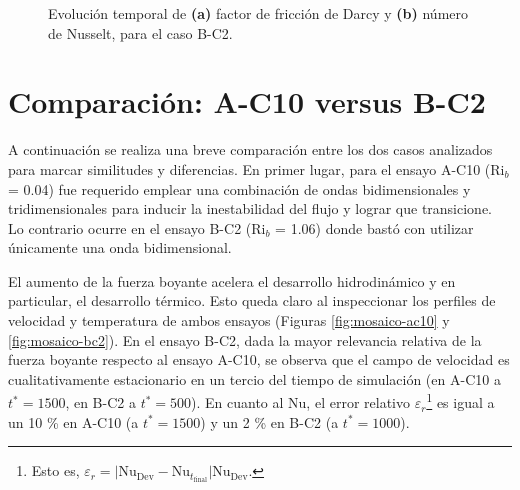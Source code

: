 \begin{figure}[H]
  \centering  
    
  \caption{Evolución temporal de \textbf{(a)} factor de fricción de Darcy y \textbf{(b)} número de Nusselt, para el caso B-C2.}
  \label{fig:bc2-1}
\end{figure}

\section{Comparación: A-C10 versus B-C2}

A continuación se realiza una breve comparación entre los dos casos analizados para marcar similitudes y diferencias. En primer lugar, para el ensayo A-C10 (Ri$_b$ = 0.04) fue requerido emplear una combinación de ondas bidimensionales y tridimensionales para inducir la inestabilidad del flujo y lograr que transicione. Lo contrario ocurre en el ensayo B-C2 (Ri$_b$ = 1.06) donde bastó con utilizar únicamente una onda bidimensional.

El aumento de la fuerza boyante acelera el desarrollo hidrodinámico y en particular, el desarrollo térmico. Esto queda claro al inspeccionar los perfiles de velocidad y temperatura de ambos ensayos (Figuras \ref{fig:mosaico-ac10} y \ref{fig:mosaico-bc2}). En el ensayo B-C2, dada la mayor relevancia relativa de la fuerza boyante respecto al ensayo A-C10, se observa que el campo de velocidad es cualitativamente estacionario en un tercio del tiempo de simulación (en A-C10 a $t^* = 1500$, en B-C2 a $t^* = 500$). En cuanto al Nu, el error relativo $\varepsilon_r$\footnote{Esto es, $\varepsilon_r =  \vert \text{Nu}_{\text{Dev}} - \text{Nu}_{t_{\text{final}}} \vert \text{Nu}_{\text{Dev}}$.} es igual a un 10 \% en A-C10 (a $t^* = 1500$) y un 2 \% en B-C2 (a $t^* = 1000$).

